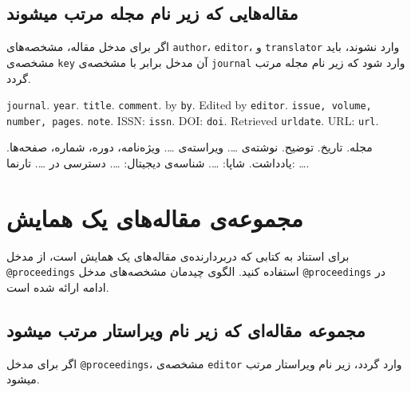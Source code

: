 \documentclass[a4paper,11pt]{article}
\begin{document}
\subsection{مقاله‌هایی که زیر نام مجله مرتب میشوند}
اگر برای مدخل مقاله، مشخصه‌های \verb|author|، \verb|editor|، و \verb|translator| وارد نشوند، باید مشخصه‌ی \verb|key| آن مدخل برابر با مشخصه‌ی \verb|journal| وارد شود که زیر نام مجله مرتب گردد.

\begin{itemize}[nosep]
\begin{latin}
\item[] []
{\tt journal}. {\tt year}. {\tt title}. {\tt comment}. by {\tt by}. Edited by {\tt editor}. {\tt issue, volume, number, pages}. {\tt note}. ISSN: {\tt issn}. DOI: {\tt doi}. Retrieved {\tt urldate}. URL: {\tt url}. 
\end{latin}

\item[] []
{\persianttfamily مجله}. {\persianttfamily تاریخ}. {\persianttfamily توضیح}. نوشته‌ی {\persianttfamily …}. ویراسته‌ی {\persianttfamily …}. {\persianttfamily ویژه‌نامه، دوره، شماره، صفحه‌ها}. {\persianttfamily یادداشت}. شاپا: {\persianttfamily …}. شناسه‌ی دیجیتال: {\persianttfamily …}. دسترسی در {\persianttfamily …}. تارنما: {\persianttfamily …}. 
\end{itemize}










\section{مجموعه‌ی مقاله‌های یک همایش}
برای استناد به کتابی که دربردارنده‌ی مقاله‌های یک همایش است، از مدخل \verb|@proceedings| استفاده کنید. الگوی چیدمان مشخصه‌های مدخل \verb|@proceedings| در ادامه ارائه شده است.





\subsection{مجموعه مقاله‌ای که زیر نام ویراستار مرتب میشود}
اگر برای مدخل \verb|@proceedings|، مشخصه‌ی \verb|editor| وارد گردد، زیر نام ویراستار مرتب میشود.
\end{document}
